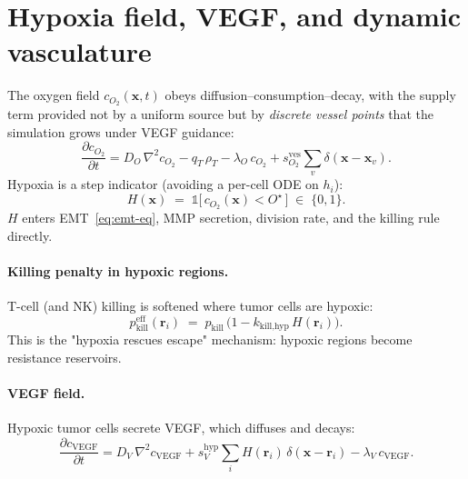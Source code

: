 \documentclass[11pt,letterpaper]{article}
\begin{document}
\section{Hypoxia field, VEGF, and dynamic vasculature}
\label{sec:m2-hypoxia}

The oxygen field $c_{O_2}(\mathbf{x},t)$ obeys
diffusion--consumption--decay, with the supply term provided not by a
uniform source but by \emph{discrete vessel points} that the
simulation grows under VEGF guidance:
\begin{equation}
\boxed{\;
\frac{\partial c_{O_2}}{\partial t}
  = D_O\,\nabla^2 c_{O_2}
  - q_T\,\rho_T - \lambda_O\,c_{O_2}
  + s_{O_2}^{\text{ves}} \sum_{v} \delta(\mathbf{x}-\mathbf{x}_v).
\;}
\label{eq:O2-implemented}
\end{equation}
Hypoxia is a step indicator (avoiding a per-cell ODE on $h_i$):
\begin{equation}
H(\mathbf{x}) \;=\; \mathbb{1}\!\big[\,c_{O_2}(\mathbf{x}) < O^\star\,\big]\;\in\;\{0, 1\}.
\end{equation}
$H$ enters EMT~\eqref{eq:emt-eq}, MMP secretion, division rate, and the
killing rule directly.

\paragraph{Killing penalty in hypoxic regions.}
T-cell (and NK) killing is softened where tumor cells are hypoxic:
\begin{equation}
p_{\text{kill}}^{\text{eff}}(\mathbf{r}_i) \;=\; p_{\text{kill}}\,
   \big(1 - k_{\text{kill,hyp}}\,H(\mathbf{r}_i)\big).
\end{equation}
This is the "hypoxia rescues escape" mechanism: hypoxic regions
become resistance reservoirs.

\paragraph{VEGF field.}
Hypoxic tumor cells secrete VEGF, which diffuses and decays:
\begin{equation}
\frac{\partial c_{\text{VEGF}}}{\partial t}
   = D_V\,\nabla^2 c_{\text{VEGF}}
   + s_V^{\text{hyp}}\sum_i H(\mathbf{r}_i)\,\delta(\mathbf{x}-\mathbf{r}_i)
   - \lambda_V\,c_{\text{VEGF}}.
\end{equation}
\end{document}
